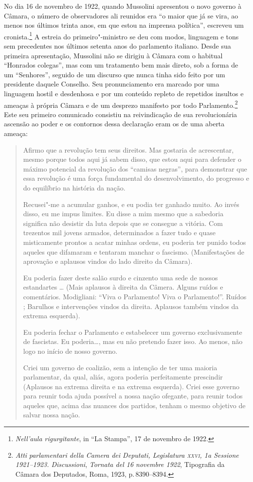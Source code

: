 No dia 16 de novembro de 1922, quando Mussolini apresentou o novo
governo à Câmara, o número de observadores ali reunidos era ``o maior
que já se vira, ao menos nos últimos trinta anos, em que estou na
imprensa política'', escreveu um cronista.\footnote{\emph{Nell'aula
  rigurgitante}, in ``La Stampa'', 17 de novembro de 1922.} A estreia
do primeiro"-ministro se deu com modos, linguagem e tons sem precedentes
nos últimos setenta anos do parlamento italiano. Desde sua primeira
apresentação, Mussolini não se dirigiu à Câmara com o habitual ``Honrados
colegas'', mas com um tratamento bem mais direto, sob a forma de um
``Senhores'', seguido de um discurso que nunca tinha sido feito por um
presidente daquele Conselho. Seu pronunciamento era marcado por uma
linguagem hostil e desdenhosa e por um conteúdo repleto de repetidos
insultos e ameaças à própria Câmara e de um desprezo manifesto por todo
Parlamento.\footnote{\emph{Atti} \emph{parlamentari della Camera dei
  Deputati, Legislatura \textsc{xxvi}, 1a Sessione 1921--1923. Discussioni},
  \emph{Tornata del 16 novembre 1922}, Tipografia da Câmara dos
  Deputados, Roma, 1923, p.\,8390--8394.} Este seu primeiro comunicado
consistiu na reivindicação de sua revolucionária ascensão ao poder e os
contornos dessa declaração eram os de uma aberta ameaça:

\begin{quote}
Afirmo que a revolução tem seus direitos. Mas gostaria de acrescentar,
mesmo porque todos aqui já sabem disso, que estou aqui para defender o
máximo potencial da revolução dos ``camisas negras'', para demonstrar que
essa revolução é uma força fundamental do desenvolvimento, do progresso
e do equilíbrio na história da nação.

Recusei"-me a acumular ganhos, e eu podia ter ganhado muito. Ao invés
disso, eu me impus limites. Eu disse a mim mesmo que a sabedoria
significa não desistir da luta depois que se consegue a vitória. Com
trezentos mil jovens armados, determinados a fazer tudo e quase
misticamente prontos a acatar minhas ordens, eu poderia ter punido todos
aqueles que difamaram e tentaram manchar o fascismo. (Manifestações de
aprovação e aplausos vindos do lado direito da Câmara).

Eu poderia fazer deste salão surdo e cinzento uma sede de nossos
estandartes \ldots{} (Mais aplausos à direita da Câmera. Alguns ruídos e
comentários. Modigliani: ``Viva o Parlamento! Viva o Parlamento!''. Ruídos
; Barulhos e intervenções vindos da direita. Aplausos também vindos da
extrema esquerda).

Eu poderia fechar o Parlamento e estabelecer um governo exclusivamente
de fascistas. Eu poderia\ldots{}, mas eu não pretendo fazer isso. Ao menos,
não logo no início de nosso governo.

Criei um governo de coalizão, sem a intenção de ter uma maioria
parlamentar, da qual, aliás, agora poderia perfeitamente prescindir
(Aplausos na extrema direita e na extrema esquerda). Criei esse governo
para reunir toda ajuda possível a nossa nação ofegante, para reunir
todos aqueles que, acima das nuances dos partidos, tenham o mesmo
objetivo de salvar nossa nação.
\end{quote}

